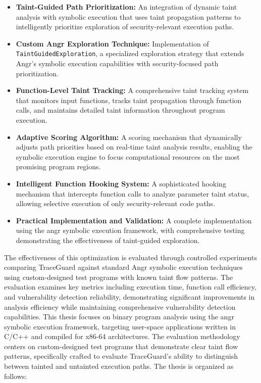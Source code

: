 \begin{itemize}
    \item \textbf{Taint-Guided Path Prioritization:} An integration of dynamic taint analysis with symbolic execution that uses taint propagation patterns to intelligently prioritize exploration of security-relevant execution paths.
    \item \textbf{Custom Angr Exploration Technique:} Implementation of\\ \texttt{TaintGuidedExploration}, a specialized exploration strategy that extends Angr's symbolic execution capabilities with security-focused path prioritization.
    \item \textbf{Function-Level Taint Tracking:} A comprehensive taint tracking system that monitors input functions, tracks taint propagation through function calls, and maintains detailed taint information throughout program execution.
    \item \textbf{Adaptive Scoring Algorithm:} A scoring mechanism that dynamically adjusts path priorities based on real-time taint analysis results, enabling the symbolic execution engine to focus computational resources on the most promising program regions.
    \item \textbf{Intelligent Function Hooking System:} A sophisticated hooking mechanism that intercepts function calls to analyze parameter taint status, allowing selective execution of only security-relevant code paths.
    \item \textbf{Practical Implementation and Validation:} A complete implementation using the angr symbolic execution framework, with comprehensive testing demonstrating the effectiveness of taint-guided exploration.
\end{itemize}

The effectiveness of this optimization is evaluated through controlled experiments comparing TraceGuard against standard Angr symbolic execution techniques using custom-designed test programs with known taint flow patterns.
The evaluation examines key metrics including execution time, function call efficiency, and vulnerability detection reliability, demonstrating significant improvements in analysis efficiency while maintaining comprehensive vulnerability detection capabilities.
This thesis focuses on binary program analysis using the angr symbolic execution framework, targeting user-space applications written in C/C++ and compiled for x86-64 architectures.
The evaluation methodology centers on custom-designed test programs that demonstrate clear taint flow patterns, specifically crafted to evaluate TraceGuard's ability to distinguish between tainted and untainted execution paths.
The thesis is organized as follows:


